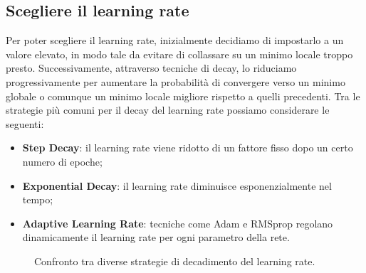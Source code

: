\subsection{Scegliere il learning rate}
Per poter scegliere il learning rate, inizialmente decidiamo di impostarlo a un valore elevato, in modo tale da evitare di collassare su un minimo locale troppo presto. Successivamente, attraverso tecniche di decay, lo riduciamo progressivamente per aumentare la probabilità di convergere verso un minimo globale o comunque un minimo locale migliore rispetto a quelli precedenti. Tra le strategie più comuni per il decay del learning rate possiamo considerare le seguenti:
\begin{itemize}
\item\textbf{Step Decay}: il learning rate viene ridotto di un fattore fisso dopo un certo numero di epoche;
\item\textbf{Exponential Decay}: il learning rate diminuisce esponenzialmente nel tempo;
\item\textbf{Adaptive Learning Rate}: tecniche come Adam e RMSprop regolano dinamicamente il learning rate per ogni parametro della rete.
\end{itemize}

\begin{figure}[!ht]
    \centering
    \caption{Confronto tra diverse strategie di decadimento del learning rate.}
    \label{fig:lr_decay}
\end{figure}

